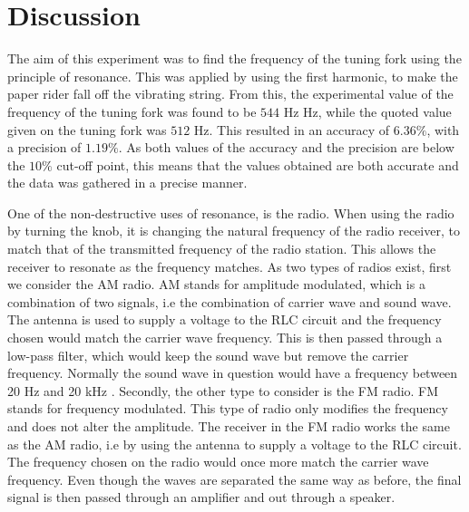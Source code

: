 \documentclass[12pt, a4paper]{article}
\begin{document}
\section*{Discussion}
The aim of this experiment was to find the frequency of the tuning fork using the principle of resonance. This was applied by using the first harmonic, to make the paper rider fall off the vibrating string. From this, the experimental value of the frequency of the tuning fork was found to be $544$ Hz  Hz, while the quoted value given on the tuning fork was $512$ Hz. This resulted in an accuracy of $6.36\%$, with a precision of $1.19\%$. As both values of the accuracy and the precision are below the $10\%$ cut-off point, this means that the values obtained are both accurate and the data was gathered in a precise manner. 

\noindent
One of the non-destructive uses of resonance, is the radio. When using the radio by turning the knob, it is changing the natural frequency of the radio receiver, to match that of the transmitted frequency of the radio station. This allows the receiver to resonate as the frequency matches. As two types of radios exist, first we consider the AM radio. AM stands for amplitude modulated, which is a combination of two signals, i.e the combination of carrier wave and sound wave. The antenna is used to supply a voltage to the RLC circuit and the frequency chosen would match the carrier wave frequency. This is then passed through a low-pass filter, which would keep the sound wave but remove the carrier frequency. Normally the sound wave in question would have a frequency between 20 Hz and 20 kHz \parencite{radio}. Secondly, the other type to consider is the FM radio. FM stands for frequency modulated. This type of radio only modifies the frequency and does not alter the amplitude. The receiver in the FM radio works the same as the AM radio, i.e by using the antenna to supply a voltage to the RLC circuit. The frequency chosen on the radio would once more match the carrier wave frequency. Even though the waves are separated the same way as before, the final signal is then passed through an amplifier and out through a speaker\parencite{radio}.

\printbibliography[title = {References:}]
\end{document}

